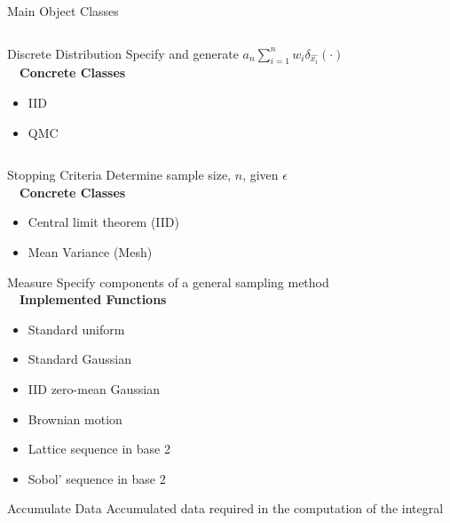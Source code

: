 \documentclass[final]{beamer}
\newlength{\onecolwid}
\newlength{\twocolwid}
\newlength{\threecolwid}
\begin{document}
\begin{frame}[t]
\begin{columns}[t]
\begin{column}{\threecolwid}
\begin{columns}[t,totalwidth=\threecolwid]
\begin{column}{\twocolwid}
\begin{block}{Main Object Classes}
\begin{column}{\onecolwid}
\begin{alertblock}{Discrete Distribution}
    Specify and generate $a_n \sum_{i=1}^n w_i \delta_{\hat{x_i}}(\cdot)$ \\[1ex]~\
    \textbf{Concrete Classes}
    \begin{itemize}
        \item IID
        \item QMC
    \end{itemize}
\end{alertblock}
\end{column} 
\begin{column}{\onecolwid}   \vspace{-2ex}
\begin{alertblock}{Stopping Criteria}
    Determine sample size, $n$, given $\epsilon$\\[1ex]~\
    \textbf{Concrete Classes}
    \begin{itemize}
        \item Central limit theorem (IID)
        \item Mean Variance (Mesh)
    \end{itemize}
\end{alertblock}

\begin{alertblock}{Measure}
    Specify components of a general sampling method \\[1ex]~\
    \textbf{Implemented Functions}
    \begin{itemize}
        \item Standard uniform
        \item Standard Gaussian
        \item IID zero-mean Gaussian
        \item Brownian motion 
        \item Lattice sequence in base 2 \cite{kuo2016application,nuyensmagic}
        \item Sobol' sequence in base 2 \cite{kuo2016application,nuyensmagic}
    \end{itemize}
\end{alertblock}

\vspace{-1ex}
\begin{alertblock}{Accumulate Data}
    Accumulated data required in the computation of the integral
\end{alertblock}
\end{column}


\end{block}
\end{column}
\end{columns}
\end{column}
\end{columns}
\end{frame}
\end{document}
